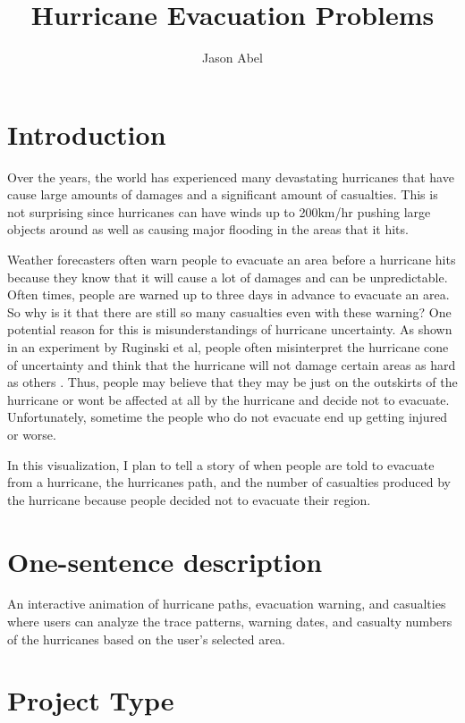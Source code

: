 \documentclass{proc}
\begin{document}
\title{Hurricane Evacuation Problems}

\author{Jason Abel}

\maketitle

\section{Introduction}

Over the years, the world has experienced many devastating hurricanes that have cause large amounts of damages and a significant amount of casualties. This is not surprising since hurricanes can have winds up to 200km/hr pushing large objects around as well as causing major flooding in the areas that it hits.

Weather forecasters often warn people to evacuate an area before a hurricane hits because they know that it will cause a lot of damages and can be unpredictable. Often times, people are warned up to three days in advance to evacuate an area. So why is it that there are still so many casualties even with these warning? One potential reason for this is misunderstandings of hurricane uncertainty. As shown in an experiment by Ruginski et al, people often misinterpret the hurricane cone of uncertainty and think that the hurricane will not damage certain areas as hard as others \cite{ruginski2016non}. Thus, people may believe that they may be just on the outskirts of the hurricane or wont be affected at all by the hurricane and decide not to evacuate. Unfortunately, sometime the people who do not evacuate end up getting injured or worse.

In this visualization, I plan to tell a story of when people are told to evacuate from a hurricane, the hurricanes path, and the number of casualties produced by the hurricane because people decided not to evacuate their region. 

\section{One-sentence description}

An interactive animation of hurricane paths, evacuation warning, and casualties where users can analyze the trace patterns, warning dates, and casualty numbers of the hurricanes based on the user's selected area. 

\section{Project Type}
\end{document}
